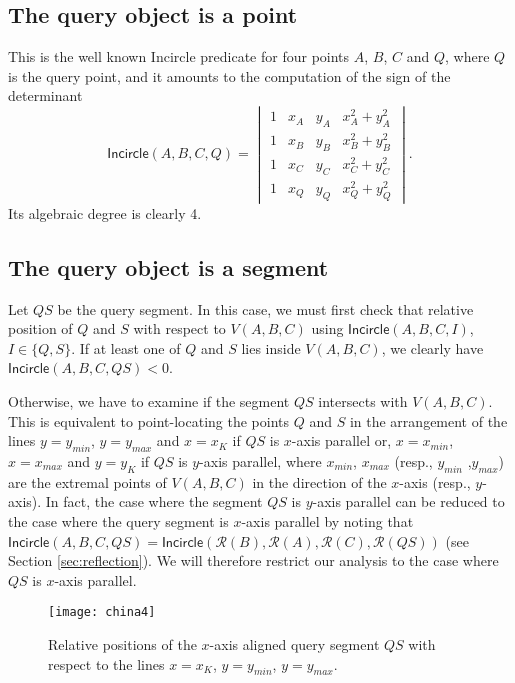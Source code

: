 \documentclass[letterpaper,11pt]{article}
\newcommand{\incircle}{\textsf{Incircle}\xspace}
\newcommand{\rfx}[1]{\mathcal{R}(#1)\xspace}
\begin{document}
\subsection{The query object is a point}\label{sec:pppp}
This is the well known \incircle predicate for four points $A$, $B$,
$C$ and $Q$, where $Q$ is the query point, and it amounts to the
computation of the sign of the determinant
\[
\incircle(A,B,C,Q) = \begin{vmatrix}
1 & x_{A} & y_{A} & x_{A}^{2} + y_{A}^{2} \\
1 & x_{B} & y_{B} & x_{B}^{2} + y_{B}^{2} \\
1 & x_{C} & y_{C} & x_{C}^{2} + y_{C}^{2} \\
1 & x_{Q} & y_{Q} & x_{Q}^{2} + y_{Q}^{2} 
\end{vmatrix}.
\]
Its algebraic degree is clearly 4. 




\subsection{The query object is a segment}\label{sec:ppps}

Let $QS$ be the query segment.
In this case, we must first check that relative position of $Q$ and
$S$ with respect to $V(A,B,C)$ using $\incircle(A,B,C,I)$, $I\in\{
Q,S\}$. If at least one of $Q$ and $S$ lies inside $V(A,B,C)$, we
clearly have $\incircle(A,B,C,QS)<0$. 

Otherwise, we have to examine if the segment $QS$ intersects with
$V(A,B,C)$. This is equivalent to point-locating the points $Q$ and
$S$ in the arrangement of the lines $y=y_{min}$, $y=y_{max}$ and
$x=x_K$ if $QS$ is $x$-axis parallel or, $x=x_{min}$, $x=x_{max}$ and $y=y_K$ if 
$QS$ is $y$-axis parallel, where $x_{min}$, $x_{max}$ (resp.,
$y_{min}$ ,$y_{max}$) are the extremal points of $V(A,B,C)$ in the
direction of the $x$-axis (resp., $y$-axis). In fact, the case where
the segment $QS$ is $y$-axis parallel can be reduced to the case where
the query segment is $x$-axis parallel by noting that 
$\incircle(A,B,C,QS)=\incircle(\rfx{B},\rfx{A},\rfx{C},\rfx{QS})$
(see Section \ref{sec:reflection}). We will
therefore restrict our analysis to the case where $QS$ is $x$-axis
parallel. 

\begin{figure}[b]
  \begin{center}
    \texttt{[image: china4]} 
  \end{center}
  \caption{Relative positions of the $x$-axis aligned query segment
    $QS$ with respect to the lines $x=x_K$, $y=y_{min}$, $y=y_{max}$.}
  \label{fig:ppps}
\end{figure}
\end{document}
